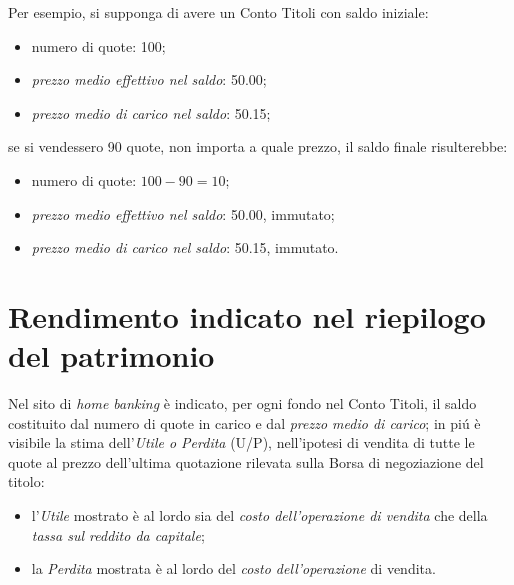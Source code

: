 \documentclass[12pt,a4paper]{article}
\newcommand{\Eur}[1]{\SI{#1}{\text{\euro{}}}}
\begin{document}
Per esempio, si supponga di avere un Conto Titoli con saldo iniziale:
\begin{itemize}
\item numero di quote: \num{100};
\item \emph{prezzo medio effettivo nel saldo}: \Eur{50,00};
\item \emph{prezzo medio di carico nel saldo}: \Eur{50,15};
\end{itemize}
se  si  vendessero \num{90}  quote,  non  importa a  quale  prezzo,  il saldo  finale
risulterebbe:
\begin{itemize}
\item numero di quote: \(\num{100} - \num{90} = \num{10}\);
\item \emph{prezzo medio effettivo nel saldo}: \Eur{50,00}, immutato;
\item \emph{prezzo medio di carico nel saldo}: \Eur{50,15}, immutato.
\end{itemize}

\section{Rendimento indicato nel riepilogo del patrimonio}


Nel sito di \emph{home banking} è indicato, per ogni fondo nel Conto Titoli, il saldo
costituito dal numero di quote in carico  e dal \emph{prezzo medio di carico}; in piú
è visibile  la stima dell'\emph{Utile  o Perdita}  (U/P), nell'ipotesi di  vendita di
tutte le quote al prezzo dell'ultima  quotazione rilevata sulla Borsa di negoziazione
del titolo:
\begin{itemize}
\item  l'\emph{Utile} mostrato  è al  lordo  sia del  \emph{costo dell'operazione  di
     vendita} che della \emph{tassa sul reddito da capitale};
\item  la \emph{Perdita}  mostrata è  al  lordo del  \emph{costo dell'operazione}  di
  vendita.
\end{itemize}
\end{document}
